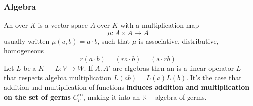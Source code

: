 \subsubsection{Algebra}

An  over  \(K\) is a vector space \(A\) over \(K\) with a multiplication map 
%
\begin{equation}
    \mu\colon A \times A \rightarrow A 
\end{equation}
%
usually written \(\mu(a,b)=a \cdot b\), such that \(\mu\) is associative, distributive, homogeneous
%
\begin{equation}
    r(a\cdot b) = (ra \cdot b) = (a\cdot rb)
\end{equation}
%
Let \(L\) be a \(K-\) \(L\colon V \rightarrow W\). 
%
If \(A, A'\) are algebras then an  is a linear operator \(L\) that respects algebra multiplication \(L(ab) = L(a)L(b)\).
%
It's the case that addition and multiplication of functions \textbf{induces addition and multiplication on the set of germs} \(C_p^\infty\), making it into an \(\mathbb{R}-\)algebra of germs.